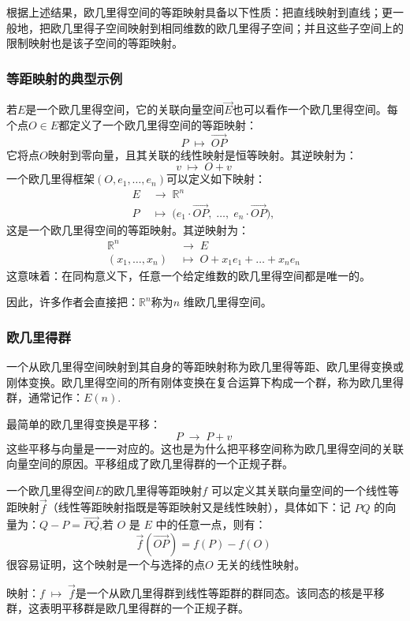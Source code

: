 根据上述结果，欧几里得空间的等距映射具备以下性质：把直线映射到直线；更一般地，把欧几里得子空间映射到相同维数的欧几里得子空间；并且这些子空间上的限制映射也是该子空间的等距映射。
\subsubsection{等距映射的典型示例}
若$E$是一个欧几里得空间，它的关联向量空间$\overrightarrow{E}$也可以看作一个欧几里得空间。每个点$O \in E$都定义了一个欧几里得空间的等距映射：
$$
P \;\mapsto\; \overrightarrow{OP}~
$$
它将点$O$映射到零向量，且其关联的线性映射是恒等映射。其逆映射为：
$$
v \;\mapsto\; O + v~
$$
一个欧几里得框架$(O, e_1, \dots, e_n)$可以定义如下映射：
$$
\begin{aligned}
E &\;\to\; \mathbb{R}^n \\
P &\;\mapsto\; 
\bigl( e_1 \cdot \overrightarrow{OP}, \; \dots, \; e_n \cdot \overrightarrow{OP} \bigr),
\end{aligned}~
$$
这是一个欧几里得空间的等距映射。其逆映射为：
$$
\begin{aligned}
\mathbb{R}^n &\;\to\; E \\
(x_1, \dots, x_n) &\;\mapsto\; 
O + x_1 e_1 + \dots + x_n e_n
\end{aligned}~
$$
这意味着：在同构意义下，任意一个给定维数的欧几里得空间都是唯一的。

因此，许多作者会直接把：$\mathbb{R}^n$称为$n$ 维欧几里得空间。
\subsubsection{欧几里得群}
一个从欧几里得空间映射到其自身的等距映射称为欧几里得等距、欧几里得变换或刚体变换。欧几里得空间的所有刚体变换在复合运算下构成一个群，称为欧几里得群，通常记作：$E(n)$.

最简单的欧几里得变换是平移：
$$
P \;\to\; P + v~
$$
这些平移与向量是一一对应的。这也是为什么把平移空间称为欧几里得空间的关联向量空间的原因。平移组成了欧几里得群的一个正规子群。

一个欧几里得空间$E$的欧几里得等距映射$f$ 可以定义其关联向量空间的一个线性等距映射$\overrightarrow{f}$（线性等距映射指既是等距映射又是线性映射），具体如下：记 $P Q$ 的向量为：$Q - P = \overrightarrow{PQ}$,若 $O$ 是 $E$ 中的任意一点，则有：
$$
\overrightarrow{f}(\overrightarrow{OP}) = f(P) - f(O)~
$$
很容易证明，这个映射是一个与选择的点$O$ 无关的线性映射。

映射：$f \;\longmapsto\; \overrightarrow{f}$是一个从欧几里得群到线性等距群的群同态。该同态的核是平移群，这表明平移群是欧几里得群的一个正规子群。

